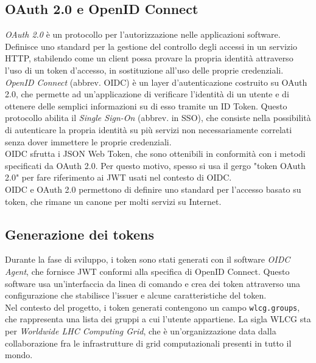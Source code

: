 \subsection{OAuth 2.0 e OpenID Connect}
\textit{OAuth 2.0} è un protocollo per l'autorizzazione nelle applicazioni software. Definisce uno standard per la gestione del controllo degli accessi
in un servizio HTTP, stabilendo come un client possa provare la propria identità attraverso l'uso di un token d'accesso, in sostituzione all'uso delle proprie credenziali. 
\\ \textit{OpenID Connect} (abbrev. OIDC) è un layer d'autenticazione costruito su OAuth 2.0, che permette ad un'applicazione di 
verificare l'identità di un utente e di ottenere delle semplici informazioni su di esso tramite un ID Token. Questo protocollo abilita il \textit{Single Sign-On} (abbrev. in SSO), 
che consiste nella possibilità di autenticare la propria identità su più servizi non necessariamente correlati senza dover immettere le proprie credenziali. 
\\OIDC sfrutta i JSON Web Token, che sono ottenibili in conformità con i metodi specificati da OAuth 2.0. Per questo motivo, spesso si usa il gergo
"token OAuth 2.0" per fare riferimento ai JWT usati nel contesto di OIDC.  
\\OIDC e OAuth 2.0 permettono di definire uno standard per l'accesso basato su token, che rimane un canone per molti servizi su Internet.

\subsection{Generazione dei tokens}
Durante la fase di sviluppo, i token sono stati generati con il software \textit{OIDC Agent}, che fornisce JWT conformi alla specifica di OpenID Connect.
Questo software usa un'interfaccia da linea di comando e crea dei token attraverso una configurazione che stabilisce l'issuer e alcune caratteristiche del token.
\\ Nel contesto del progetto, i token generati contengono un campo \texttt{wlcg.groups}, che rappresenta una lista dei gruppi a cui l'utente appartiene. 
La sigla WLCG sta per \textit{Worldwide LHC Computing Grid}, che è un'organizzazione data dalla collaborazione fra le infrastrutture di 
grid computazionali presenti in tutto il mondo. 



